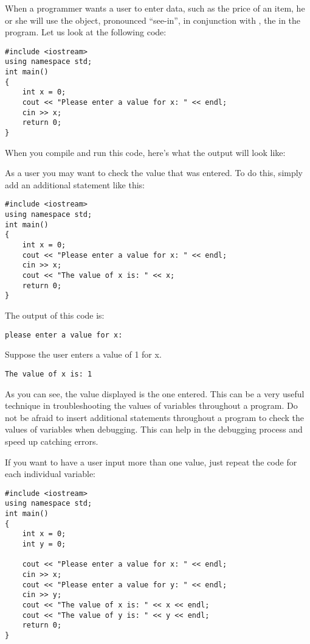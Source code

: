 When a programmer wants a user to enter data, such as the price of an item, he or she will use the  object, pronounced ``see-in'', in conjunction with \Code{>>}, the  in the program. 
Let us look at the following code:

\begin{lstlisting}
#include <iostream>
using namespace std;
int main()
{
	int x = 0;   				      
	cout << "Please enter a value for x: " << endl; 
	cin >> x;
	return 0;
}
\end{lstlisting}

When you compile and run this code, here's what the output will look like:

\noindent {}

As a user you may want to check the value that was entered. 
To do this, simply add an additional  statement like this:

\begin{lstlisting}
#include <iostream>
using namespace std;
int main()
{
	int x = 0;   				      
	cout << "Please enter a value for x: " << endl; 
	cin >> x;
	cout << "The value of x is: " << x;
	return 0;
}
\end{lstlisting}

The output of this code is:

\noindent \texttt{please enter a value for x: }

Suppose the user enters a value of 1 for x.

\noindent \texttt{The value of x is: 1}

As you can see, the value displayed is the one entered. 
This can be a very useful technique in troubleshooting the values of variables throughout a program. 
Do not be afraid to insert additional  statements throughout a program to check the values of variables when debugging. 
This can help in the debugging process and speed up catching errors. 

If you want to have a user input more than one value, just repeat the code for each individual variable:

\begin{lstlisting}
#include <iostream>
using namespace std;
int main()
{
	int x = 0;
	int y = 0;
	
	cout << "Please enter a value for x: " << endl;
	cin >> x;
	cout << "Please enter a value for y: " << endl;
	cin >> y;
	cout << "The value of x is: " << x << endl;
	cout << "The value of y is: " << y << endl;
	return 0;
}
\end{lstlisting}

